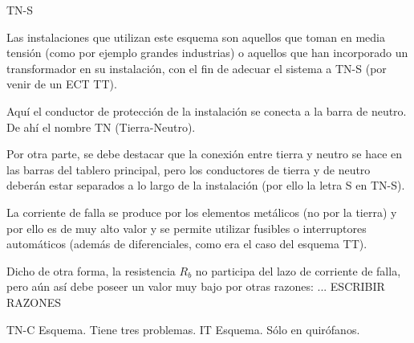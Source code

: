 TN-S

Las instalaciones que utilizan este esquema son aquellos que toman en media tensión (como por ejemplo grandes industrias) o aquellos que han incorporado un transformador en su instalación, con el fin de adecuar el sistema a TN-S (por venir de un ECT TT).

Aquí el conductor de protección de la instalación se conecta a la barra de neutro. De ahí el nombre TN (Tierra-Neutro).

Por otra parte, se debe destacar que la conexión entre tierra y neutro se hace en las barras del tablero principal, pero los conductores de tierra y de neutro deberán estar separados a lo largo de la instalación (por ello la letra S en TN-S).

La corriente de falla se produce por los elementos metálicos (no por la tierra) y por ello es de muy alto valor y se permite utilizar fusibles o interruptores automáticos (además de diferenciales, como era el caso del esquema TT).

Dicho de otra forma, la resistencia $R_b$ no participa del lazo de corriente de falla, pero aún así debe poseer un valor muy bajo por otras razones: ... ESCRIBIR RAZONES


TN-C
Esquema.
Tiene tres problemas.
IT
Esquema.
Sólo en quirófanos.